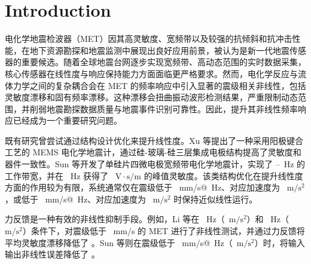 \documentclass[sn-nature]{sn-jnl}
\newif\ifCNENEnglish
\newif\ifCNENBilingual
\newcommand{\CNEN}[2]{%
    \ifCNENBilingual
        #1%
        \if\relax\detokenize{#2}\relax\else\par #2\fi%
    \else
        \ifCNENEnglish
            #2%
        \else
            #1%
        \fi
    \fi
}
\begin{document}

\maketitle

\section{Introduction}

\CNEN{电化学地震检波器（MET）因其高灵敏度、宽频带以及较强的抗倾斜和抗冲击性能，在地下资源勘探和地震监测中展现出良好应用前景，被认为是新一代地震传感器的重要候选\cite{10841463}。随着全球地震台网逐步实现宽频带、高动态范围的实时数据采集\cite{WOS:000853457100001}，核心传感器在线性度与响应保持能力方面面临更严格要求。然而，电化学反应与流体力学之间的复杂耦合会在 MET 的频率响应中引入显著的震级相关非线性，包括灵敏度漂移和固有频率漂移。这种漂移会扭曲振动波形检测结果，严重限制动态范围，并削弱地震勘探数据质量与地震事件识别可靠性。因此，提升其非线性频率响应已经成为一个重要研究问题。}{}


\CNEN{既有研究曾尝试通过结构设计优化来提升线性度。Xu 等\cite{9481294}提出了一种采用阳极键合工艺的 MEMS 电化学地震计，通过硅-玻璃-硅三层集成电极结构提高了灵敏度和器件一致性。Sun 等\cite{sun_high-consistency_2017}开发了单硅片四微电极宽频带电化学地震计，实现了 \valXuBandwidthStart--\valXuBandwidthEnd~Hz 的工作带宽，并在 \valXuPeakSensitivityFreq~Hz 获得了 \valXuPeakSensitivity~$\text{V} \cdot \text{s}/\text{m}$ 的峰值灵敏度。该类结构优化在提升线性度方面的作用较为有限，系统通常仅在震级低于 \valXuLinearLimitMm~mm/s@\valLinearLimitRefFreq~Hz、对应加速度为 \valXuLinearLimitAcc~$\text{m}/\text{s}^2$\cite{9481294}，或低于 \valSunLinearLimitMm~mm/s@\valLinearLimitRefFreq~Hz、对应加速度为 \valSunLinearLimitAcc~$\text{m}/\text{s}^2$\cite{sun_high-consistency_2017} 时保持近似线性运行。}{}

\CNEN{力反馈是一种有效的非线性抑制手段。例如，Li 等\cite{li_electrochemical_2017}在 \valLiForceFreqA~Hz（\valLiForceAccA~$\text{m}/\text{s}^2$）和 \valLiForceFreqB~Hz（\valLiForceAccB~$\text{m}/\text{s}^2$）条件下，对震级低于 \valLiForceMm~mm/s 的 MET 进行了非线性测试，并通过力反馈将平均灵敏度漂移降低了 \valLiSensitivityDriftReduction。Sun 等\cite{WOS:000408118700046}则在震级低于 \valSunForceMm~mm/s@\valSunForceFreq~Hz（\valSunForceAcc~$\text{m}/\text{s}^2$）时，将输入输出非线性误差降低了 \valSunNonlinearErrorReduction。}{}
\end{document}
